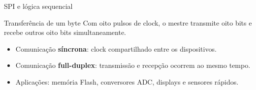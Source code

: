 \begin{frame}{SPI e lógica sequencial}
\begin{block}{Transferência de um byte}
Com oito pulsos de clock, o mestre transmite oito bits e recebe outros oito bits simultaneamente.
\end{block}
\begin{itemize}
  \item Comunicação \textbf{síncrona}: clock compartilhado entre os dispositivos.
  \item Comunicação \textbf{full-duplex}: transmissão e recepção ocorrem ao mesmo tempo.
  \item Aplicações: memória Flash, conversores ADC, displays e sensores rápidos.
\end{itemize}
\end{frame}
